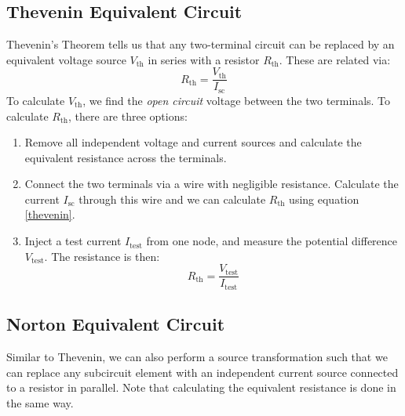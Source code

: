 \documentclass{article}
\begin{document}
    \subsection{Thevenin Equivalent Circuit}
    Thevenin's Theorem tells us that any two-terminal circuit can be replaced by an equivalent voltage source $V_\text{th}$ in series with a resistor $R_\text{th}$. These are related via:
    \begin{equation}
        \label{thevenin}
        R_\text{th} = \frac{V_\text{th}}{I_\text{sc}}
    \end{equation} 
    To calculate $V_\text{th}$, we find the \textit{open circuit} voltage between the two terminals. To calculate $R_\text{th}$, there are three options:
    \begin{enumerate}
        \item Remove all independent voltage and current sources and calculate the equivalent resistance across the terminals.
        \item Connect the two terminals via a wire with negligible resistance. Calculate the current $I_\text{sc}$ through this wire and we can calculate $R_\text{th}$ using equation \ref{thevenin}.
        \item Inject a test current $I_\text{test}$ from one node, and measure the potential difference $V_\text{test}$. The resistance is then:
        \begin{equation}
            R_\text{th} = \frac{V_\text{test}}{I_\text{test}}
        \end{equation}
    \end{enumerate}
    \subsection{Norton Equivalent Circuit}
    Similar to Thevenin, we can also perform a source transformation such that we can replace any subcircuit element with an independent current source connected to a resistor in parallel. Note that calculating the equivalent resistance is done in the same way.
\end{document}
